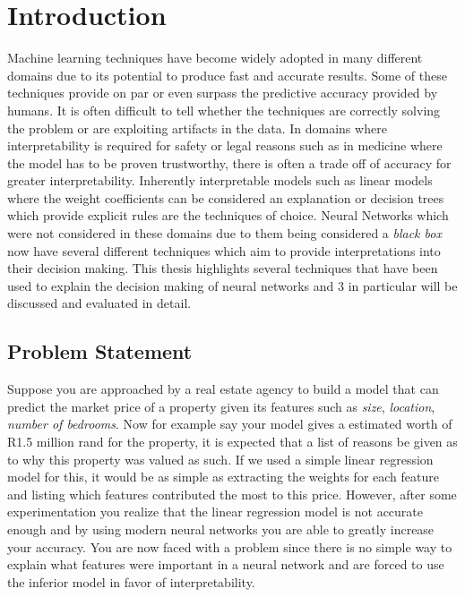 \chapter{Introduction}

Machine learning techniques have become widely adopted in many different domains due to its potential to produce fast and accurate results. Some of these techniques provide on par or even surpass the predictive accuracy provided by humans. It is often difficult to tell whether the techniques are correctly solving the problem or are exploiting artifacts in the data. In domains where interpretability is required for safety or legal reasons such as in medicine \cite{10.1145/2783258.2788613} where the model has to be proven trustworthy, there is often a trade off of accuracy for greater interpretability. Inherently interpretable models such as linear models where the weight coefficients can be considered an explanation or decision trees \cite{articleb} which provide explicit rules are the techniques of choice. Neural Networks which were not considered in these domains due to them being considered a \emph{black box} now have several different techniques which aim to provide interpretations into their decision making. This thesis highlights several techniques that have been used to explain the decision making of neural networks and 3 in particular will be discussed and evaluated in detail.

\section{Problem Statement} \label{sect-intro-problem}
Suppose you are approached by a real estate agency to build a model that can predict the market price of a property given its features such as \emph{size}, \emph{location}, \emph{number of bedrooms}. Now for example say your model gives a estimated worth of R1.5 million rand for the property, it is expected that a list of reasons be given as to why this property was valued as such. If we used a simple linear regression model for this, it would be as simple as extracting the weights for each feature and listing which features contributed the most to this price. However, after some experimentation you realize that the linear regression model is not accurate enough and by using modern neural networks you are able to greatly increase your accuracy. You are now faced with a problem since there is no simple way to explain what features were important in a neural network and are forced to use the inferior model in favor of interpretability.
